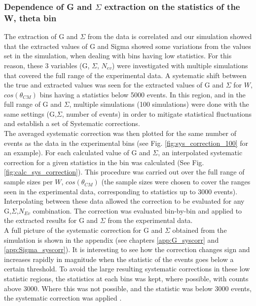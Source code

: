 \subsubsection{Dependence of G and \texorpdfstring{$\Sigma$}{Sigma} extraction on the  statistics of the W, theta bin}\label{sec:G_Sigma_sys}
The extraction of G and $\Sigma$ from the data is correlated and our simulation showed that the extracted values of G and Sigma showed some variations from the values set in the simulation, when dealing with bins having low statistics.  For this reason, these 3 variables (G, $\Sigma$, $N_{ev}$) were investigated with multiple simulations that covered the full range of the experimental data. A systematic shift between the true and extracted values was seen for the extracted values of G and $\Sigma$ for $W$, $cos(\theta_{CM})$ bins having a statistics below 5000 events. In this region, and in the full range of G and $\Sigma$, multiple simulations (100 simulations) were done with the same settings (G,$\Sigma$, number of events) in order to mitigate statistical fluctuations and establish a set of Systematic corrections.  \\
The averaged systematic correction was then plotted for the same number of events as the data in the experimental bins (see Fig. \ref{fig:sys_correction_100} for an example). For each calculated value of G and $\Sigma$, an interpolated systematic correction for a given statistics in the bin was calculated (See Fig. \ref{fig:calc_sys_correction}). 
This procedure was carried out over the full range of sample sizes per $W$, $cos(\theta_{CM})$ (the sample sizes were chosen to cover the ranges seen in the experimental data, corresponding to statistics up to 3000 events). Interpolating between these data allowed the correction to be evaluated for any G,$\Sigma$,$N_{Ev}$ combination. The correction was evaluated bin-by-bin and applied to the extracted results for G and $\Sigma$ from the experimental data.  \\
A full picture of the systematic correction for G and $\Sigma$ obtained from the simulation is shown in the appendix (see chapters \ref{app:G_syscorr} and \ref{app:Sigma_syscorr}). It is interesting to see how the correction changes sign and increases rapidly in magnitude when the statistic of the events goes below a certain threshold. To avoid the large resulting systematic corrections in these low statistic regions, the statistics at each bins was kept, where possible, with counts above 3000. Where this was not possible, and the statistic was below 3000 events, the systematic correction was applied . 
